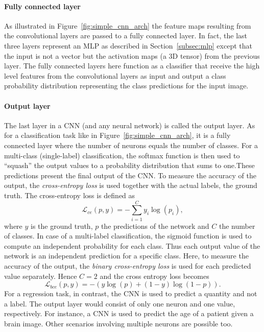 \documentclass[a4paper,12pt]{report}
\begin{document}
\paragraph{Fully connected layer    } As illustrated in Figure~\ref{fig:simple_cnn_arch} the feature maps resulting from the convolutional layers are passed to a fully connected layer. In fact, the last three layers represent an MLP as described in Section~\ref{subsec:mlp} except that the input is not a vector but the activation maps (a 3D tensor) from the previous layer. The fully connected layers here function as a classifier that receive the high level features from the convolutional layers as input and output a class probability distribution representing the class predictions for the input image. 

\paragraph{Output layer} 
The last layer in a CNN (and any neural network) is called the output layer. As for a classification task like in Figure~\ref{fig:simple_cnn_arch}, it is a fully connected layer where the number of neurons equals the number of classes. For a multi-class (single-label) classification, the softmax function is then used to ``squash'' the output values to a probability distribution that sums to one.These predictions present the final output of the CNN. To measure the accuracy of the output, the \textit{cross-entropy loss} is used together with the actual labels, the ground truth. The cross-entropy loss is defined as 
\begin{equation} \label{eq:cross_entropy}
\mathcal{L}_{ce}(p,y) = -\sum^C_{i=1} y_{i}\log(p_{i}),
\end{equation}
where $y$ is the ground truth, $p$ the predictions of the network and $C$ the number of classes. In case of a multi-label classification, the sigmoid function is used to compute an independent probability for each class. Thus each output value of the network is an independent prediction for a specific class. Here, to measure the accuracy of the output, the \textit{binary cross-entropy loss} is used for each predicted value separately. Hence $C=2$ and the cross entropy loss becomes
\begin{equation} \label{eq:cross_entropy_binary}
\mathcal{L}_{bce}(p, y) = -(y\log(p) + (1 - y)\log(1-p)).
\end{equation}
For a regression task, in contrast, the CNN is used to predict a quantity and not a label. The output layer would consist of only one neuron and one value, respectively. For instance, a CNN is used to predict the age of a patient given a brain image. Other scenarios involving multiple neurons are possible too.
\end{document}

